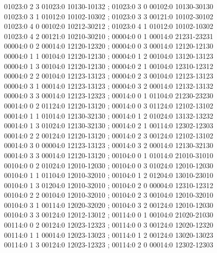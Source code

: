 \documentclass[11pt]{article}
\theoremstyle{remark}
\numberwithin{equation}{section}
\numberwithin{table}{section}
\begin{document}
\begin{flushleft}
01023:0 2 3 01023:0 10130-10132 ; 01023:0 3 0 00102:0 10130-30130\\
01023:0 3 1 01012:0 10102-10302 ; 01023:0 3 3 00121:0 10102-30102\\
01023:0 4 0 00102:0 10212-30212 ; 01023:0 4 1 01012:0 10102-10302\\
01023:0 4 2 00121:0 10210-30210 ; 00004:0 0 1 00014:0 21231-23231\\
00004:0 0 2 00014:0 12120-12320 ; 00004:0 0 3 00014:0 12120-12130\\
00004:0 1 1 00104:0 12120-12130 ; 00004:0 1 2 00104:0 13120-13123\\
00004:0 1 3 00104:0 12120-12130 ; 00004:0 2 1 00104:0 12310-12312\\
00004:0 2 2 00104:0 12123-13123 ; 00004:0 2 3 00104:0 12123-13123\\
00004:0 3 1 00014:0 12123-13123 ; 00004:0 3 2 00014:0 12132-13132\\
00004:0 3 3 00014:0 12123-12323 ; 00014:0 0 1 01104:0 21230-23230\\
00014:0 0 2 01124:0 12120-13120 ; 00014:0 0 3 01124:0 12102-13102\\
00014:0 1 1 01014:0 12130-32130 ; 00014:0 1 2 01024:0 13132-13232\\
00014:0 1 3 01024:0 12130-32130 ; 00014:0 2 1 00114:0 12302-12303\\
00014:0 2 2 00124:0 12120-13120 ; 00014:0 2 3 00124:0 12102-13102\\
00014:0 3 0 00004:0 12123-13123 ; 00014:0 3 2 00014:0 12130-32130\\
00014:0 3 3 00014:0 12120-13120 ; 00104:0 0 1 01014:0 21010-31010\\
00104:0 0 2 01024:0 12010-12030 ; 00104:0 0 3 01024:0 12010-12030\\
00104:0 1 1 01104:0 12010-32010 ; 00104:0 1 2 01204:0 13010-23010\\
00104:0 1 3 01204:0 12010-32010 ; 00104:0 2 0 00004:0 12310-12312\\
00104:0 2 2 00104:0 12010-32010 ; 00104:0 2 3 00104:0 12010-32010\\
00104:0 3 1 00114:0 12020-32020 ; 00104:0 3 2 00124:0 12010-12030\\
00104:0 3 3 00124:0 12012-13012 ; 00114:0 0 1 00104:0 21020-21030\\
00114:0 0 2 00124:0 12023-12323 ; 00114:0 0 3 00124:0 12020-12320\\
00114:0 1 1 00014:0 12023-13023 ; 00114:0 1 2 00124:0 13020-13023\\
00114:0 1 3 00124:0 12023-12323 ; 00114:0 2 0 00014:0 12302-12303\\

\end{flushleft}
\end{document}
